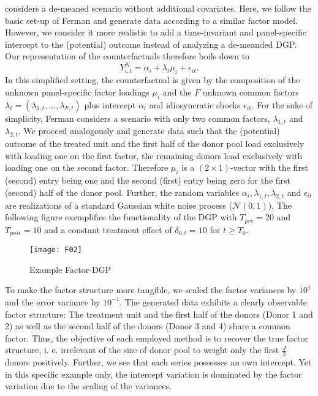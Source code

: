 \cite{ferman:2021} considers a de-meaned scenario without additional covariates. Here, we follow the basic set-up of Ferman and generate data according to a similar factor model. However, we consider it more realistic to add a time-invariant and panel-specific intercept to the (potential) outcome instead of analyzing a de-meanded \ac{DGP}. Our representation of the counterfactuals therefore boils down to 
\begin{equation*}
	Y_{i,t}^{N} = \alpha_i + \lambda_t \mu_i + \epsilon_{it}.
\end{equation*}
In this simplified setting, the counterfactual is given by the composition of the unknown panel-specific factor loadings $\mu_i$ and the $F$ unknown common factors $\lambda_t = (\lambda_{1,t}, ..., \lambda_{F,t})$ plus intercept $\alpha_i$ and idiosyncratic shocks $\epsilon_{it}$. For the sake of simplicity, Ferman considers a scenario with only two common factors, $\lambda_{1,t}$ and $\lambda_{2,t}$. We proceed analogously and generate data such that the (potential) outcome of the treated unit and the first half of the donor pool load exclusively with loading one on the first factor, the remaining donors load exclusively with loading one on the second factor. Therefore $\mu_i$ is a $(2 \times 1)$-vector with the first (second) entry being one and the second (first) entry being zero for the first (second) half of the donor pool. Further, the random variables $\alpha_i, \lambda_{1,t}, \lambda_{2,t}$ and $\epsilon_{it}$ are realizations of a standard Gaussian white noise process ($\mathcal{N}(0,1)$). The following figure exemplifies the functionality of the \ac{DGP} with $T_{pre} = 20$ and $T_{post} = 10$ and a constant treatment effect of $\delta_{0,t} = 10$ for $t \geq T_0$.
\begin{figure}[H]
	\centering
	\texttt{[image: F02]}
	\caption{Example Factor-\ac{DGP}}
	\label{F_02}
\end{figure}
To make the factor structure more tangible, we scaled the factor variances by $10^1$ and the error variance by $10^{-1}$. The generated data exhibits a clearly observable factor structure: The treatment unit and the first half of the donors (Donor 1 and 2) as well as the second half of the donors (Donor 3 and 4) share a common factor. Thus, the objective of each employed method is to recover the true factor structure, i. e. irrelevant of the size of donor pool to weight only the first $\frac{J}{2}$ donors positively. Further, we see that each series possesses an own intercept. Yet in this specific example only, the intercept variation is dominated by the factor variation due to the scaling of the variances.

